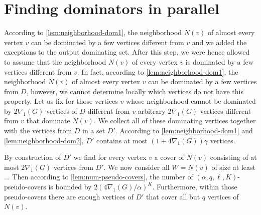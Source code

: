 
\section{Finding dominators in parallel}

According to \cref{lem:neighborhood-dom1}, the
neighborhood $N(v)$ of almost every vertex $v$
can be dominated by a few vertices different from $v$ and we added
the exceptions to the output dominating set. After this step, we
were hence allowed to assume that the neighborhood $N(v)$
of every vertex $v$ is dominated by a few vertices different from $v$.
In fact, according to \cref{lem:neighborhood-dom1}, the neighborhood $N(v)$ of almost every vertex $v$ can
be dominated by a few vertices from $D$, however, we cannot
determine locally which vertices do not have this property. Let us
fix for those vertices $v$ whose neighborhood cannot be dominated
by $2\nabla_1(G)$ vertices of $D$ different from $v$ arbitrary
$2\nabla_1(G)$ vertices different from $v$ that dominate $N(v)$.
We collect all of these dominating vertices together with the vertices
from $D$ in a set $D'$. According to \cref{lem:neighborhood-dom1} and \cref{lem:neighborhood-dom2}, $D'$ contains at most
$(1+4\nabla_1(G))\gamma$ vertices.

By construction of $D'$ we find for every vertex $v$ a cover of
$N(v)$ consisting of at most $2\nabla_1(G)$ vertices from $D'$.
We now consider all $W=N(v)$ of size at least ... Then according
to \cref{lem:num-pseudo-covers}, the number of
$(\alpha,q,\ell,K)$-pseudo-covers is bounded by
$2(4\nabla_1(G)/\alpha)^K$. Furthermore, within those
pseudo-covers there are enough vertices of $D'$ that cover
all but $q$ vertices of $N(v)$.

